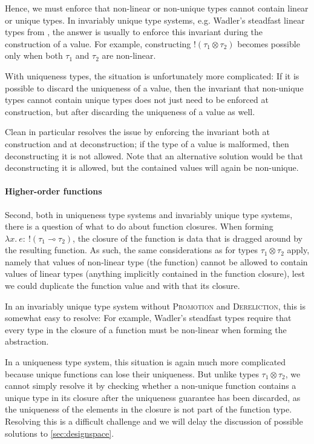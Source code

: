 Hence, we must enforce that non-linear or non-unique types cannot contain linear or unique types. In invariably unique type systems, e.g. Wadler's steadfast linear types from \cite{wadler_is_1991}, the answer is usually to enforce this invariant during the construction of a value. For example, constructing $!(\tau_1 \otimes \tau_2)$ becomes possible only when both $\tau_1$ and $\tau_2$ are non-linear.

With uniqueness types, the situation is unfortunately more complicated: If it is possible to discard the uniqueness of a value, then the invariant that non-unique types cannot contain unique types does not just need to be enforced at construction, but after discarding the uniqueness of a value as well. 

Clean in particular resolves the issue by enforcing the invariant both at construction and at deconstruction; if the type of a value is malformed, then deconstructing it is not allowed. Note that an alternative solution would be that deconstructing it is allowed, but the contained values will again be non-unique.

\paragraph{Higher-order functions} Second, both in uniqueness type systems and invariably unique type systems, there is a question of what to do about function closures. When forming $\lambda x.\ e :\ !(\tau_1 \multimap \tau_2)$, the closure of the function is data that is dragged around by the resulting function. As such, the same considerations as for types $\tau_1 \otimes \tau_2$ apply, namely that values of non-linear type (the function) cannot be allowed to contain values of linear types (anything implicitly contained in the function closure), lest we could duplicate the function value and with that its closure. 

In an invariably unique type system without \textsc{Promotion} and \textsc{Dereliction}, this is somewhat easy to resolve: For example, Wadler's steadfast types require that every type in the closure of a function must be non-linear when forming the abstraction.

In a uniqueness type system, this situation is again much more complicated because unique functions can lose their uniqueness. But unlike types $\tau_1 \otimes \tau_2$, we cannot simply resolve it by checking whether a non-unique function contains a unique type in its closure after the uniqueness guarantee has been discarded, as the uniqueness of the elements in the closure is not part of the function type. Resolving this is a difficult challenge and we will delay the discussion of possible solutions to \cref{sec:designspace}.

